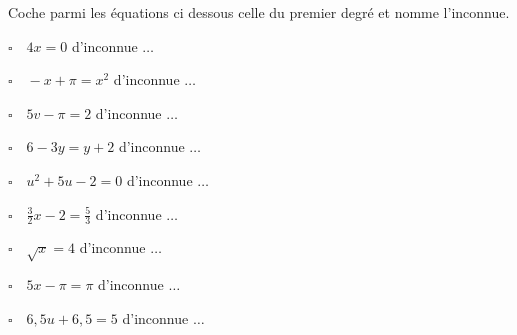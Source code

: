 
Coche parmi les équations ci dessous celle du premier degré et nomme l'inconnue.

\vspace{0.2cm}

\begin{enumerate}
\begin{minipage}{0.3\linewidth}
\item $\square \quad 4x =0$ d'inconnue $\ldots$ 
\item $\square \quad -x + \pi =x^2$ d'inconnue $\ldots$
\item $\square \quad 5v - \pi = 2$ d'inconnue $\ldots$
\end{minipage}
\begin{minipage}{0.4\linewidth}
\item $\square \quad 6-3y =y+2$ d'inconnue $\ldots$
\item $\square \quad u^2+5u-2=0$ d'inconnue $\ldots$
\item $\square \quad \frac{3}{2}x - 2 =\frac{5}{3}$ d'inconnue $\ldots$
\end{minipage}
\begin{minipage}{0.3\linewidth}
\item $\square \quad \sqrt{x} = 4$ d'inconnue $\ldots$
\item $\square \quad 5x -\pi =\pi$ d'inconnue $\ldots$
\item $\square \quad 6,5 u + 6,5 = 5$ d'inconnue $\ldots$
\end{minipage}
\end{enumerate}